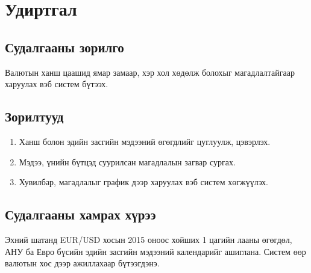 \chapter{Удиртгал}
\label{ch:introduction}

\section{Судалгааны зорилго}
Валютын ханш цаашид ямар замаар, хэр хол хөдөлж болохыг магадлалтайгаар харуулах вэб систем бүтээх.

\section{Зорилтууд}
\begin{enumerate}
    \item Ханш болон эдийн засгийн мэдээний өгөгдлийг цуглуулж, цэвэрлэх.
    \item Мэдээ, үнийн бүтцэд суурилсан магадлалын загвар сургах.
    \item Хувилбар, магадлалыг график дээр харуулах вэб систем хөгжүүлэх.
\end{enumerate}

\section{Судалгааны хамрах хүрээ}
Эхний шатанд EUR/USD хосын 2015 оноос хойших 1 цагийн лааны өгөгдөл, АНУ ба Евро бүсийн эдийн засгийн мэдээний
календарийг ашиглана. Систем өөр валютын хос дээр ажиллахаар бүтээгдэнэ.


